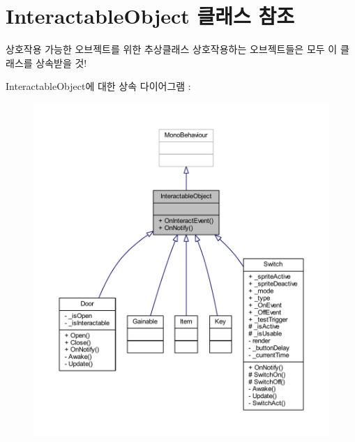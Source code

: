 \hypertarget{class_interactable_object}{}\section{Interactable\+Object 클래스 참조}
\label{class_interactable_object}


상호작용 가능한 오브젝트를 위한 추상클래스 상호작용하는 오브젝트들은 모두 이 클래스를 상속받을 것!  




Interactable\+Object에 대한 상속 다이어그램 \+: 
\nopagebreak
\begin{figure}[H]
\begin{center}
\leavevmode
\includegraphics[width=350pt]{d1/d32/class_interactable_object__inherit__graph}
\end{center}
\end{figure}



